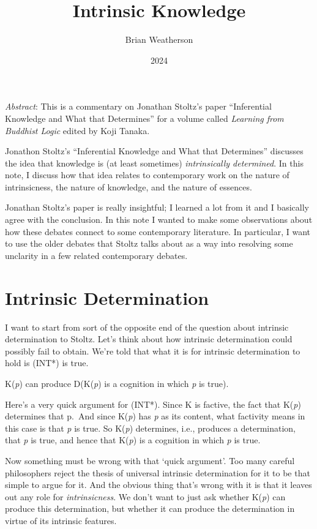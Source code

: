 \documentclass[
  11pt,
  letterpaper,
  DIV=11,
  numbers=noendperiod,
  twoside]{scrartcl}
\title{Intrinsic Knowledge}
\author{Brian Weatherson}
\date{2024}
\providecommand{\tightlist}{%
  \setlength{\itemsep}{0pt}\setlength{\parskip}{0pt}}
\renewenvironment{abstract}
 {\vspace{-1.25cm}
 \quotation\small\noindent\emph{Abstract}:}
 {\endquotation}
\renewenvironment{abstract}
 {\quotation\small\noindent\emph{Abstract}:}
 {\endquotation\vspace{-0.02cm}}
\begin{document}
\maketitle
\begin{abstract}
This is a commentary on Jonathan Stoltz's paper ``Inferential Knowledge
and What that Determines'' for a volume called \emph{Learning from
Buddhist Logic} edited by Koji Tanaka.

Jonathon Stoltz's ``Inferential Knowledge and What that Determines''
discusses the idea that knowledge is (at least sometimes)
\emph{intrinsically determined}. In this note, I discuss how that idea
relates to contemporary work on the nature of intrinsicness, the nature
of knowledge, and the nature of essences.
\end{abstract}


Jonathan Stoltz's paper is really insightful; I learned a lot from it
and I basically agree with the conclusion. In this note I wanted to make
some observations about how these debates connect to some contemporary
literature. In particular, I want to use the older debates that Stoltz
talks about as a way into resolving some unclarity in a few related
contemporary debates.

\section{Intrinsic Determination}\label{sec-intrinsic-determination}

I want to start from sort of the opposite end of the question about
intrinsic determination to Stoltz. Let's think about how intrinsic
determination could possibly fail to obtain. We're told that what it is
for intrinsic determination to hold is (INT*) is true.

\begin{description}
\tightlist
\item[(INT*)]
K(\emph{p}) can produce D(K(\emph{p}) is a cognition in which \emph{p}
is true).
\end{description}

Here's a very quick argument for (INT*). Since K is factive, the fact
that K(\emph{p}) determines that p.~And since K(\emph{p}) has \emph{p}
as its content, what factivity means in this case is that \emph{p} is
true. So K(\emph{p}) determines, i.e., produces a determination, that
\emph{p} is true, and hence that K(\emph{p}) is a cognition in which
\emph{p} is true.

Now something must be wrong with that `quick argument'. Too many careful
philosophers reject the thesis of universal intrinsic determination for
it to be that simple to argue for it. And the obvious thing that's wrong
with it is that it leaves out any role for \emph{intrinsicness}. We
don't want to just ask whether K(\emph{p}) can produce this
determination, but whether it can produce the determination in virtue of
its intrinsic features.
\end{document}
